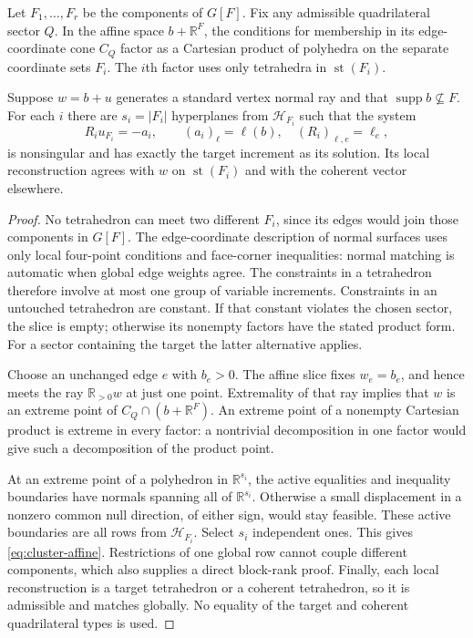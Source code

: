 \begin{theorem}\label{thm:cluster-product}
Let $F_1,\ldots,F_r$ be the components of $G[F]$.  Fix any admissible
quadrilateral sector $Q$.  In the affine space $b+\mathbb R^F$, the
conditions for membership in its edge-coordinate cone $C_Q$ factor as a
Cartesian product of polyhedra on the separate coordinate sets $F_i$.
The $i$th factor uses only tetrahedra in $\operatorname{st}(F_i)$.

Suppose $w=b+u$ generates a standard vertex normal ray and that
$\operatorname{supp}b\not\subseteq F$.  For each $i$ there are
$s_i=|F_i|$ hyperplanes from $\mathcal H_{F_i}$ such that the system
\begin{equation}\label{eq:cluster-affine}
 R_i u_{F_i}=-a_i,\qquad (a_i)_\ell=\ell(b),
 \quad (R_i)_{\ell,e}=\ell_e,
\end{equation}
is nonsingular and has exactly the target increment as its solution.
Its local reconstruction agrees with $w$ on
$\operatorname{st}(F_i)$ and with the coherent vector elsewhere.
\end{theorem}

\begin{proof}
No tetrahedron can meet two different $F_i$, since its edges would join
those components in $G[F]$.  The edge-coordinate description of normal
surfaces uses only local four-point conditions and face-corner
inequalities: normal matching is automatic when global edge weights
agree.  The constraints in a tetrahedron therefore involve at most one
group of variable increments.  Constraints in an untouched tetrahedron
are constant.  If that constant violates the chosen sector, the slice is
empty; otherwise its nonempty factors have the stated product form.  For
a sector containing the target the latter alternative applies.

Choose an unchanged edge $e$ with $b_e>0$.  The affine slice fixes
$w_e=b_e$, and hence meets the ray $\mathbb R_{>0}w$ at just one point.
Extremality of that ray implies that $w$ is an extreme point of
$C_Q\cap(b+\mathbb R^F)$.  An extreme point of a nonempty Cartesian
product is extreme in every factor: a nontrivial decomposition in one
factor would give such a decomposition of the product point.

At an extreme point of a polyhedron in $\mathbb R^{s_i}$, the active
equalities and inequality boundaries have normals spanning all of
$\mathbb R^{s_i}$.  Otherwise a small displacement in a nonzero common
null direction, of either sign, would stay feasible.  These active
boundaries are all rows from $\mathcal H_{F_i}$.  Select $s_i$
independent ones.  This gives \eqref{eq:cluster-affine}.  Restrictions of
one global row cannot couple different components, which also supplies
a direct block-rank proof.  Finally, each local reconstruction is a
target tetrahedron or a coherent tetrahedron, so it is admissible and
matches globally.  No equality of the target and coherent quadrilateral
types is used.
\end{proof}

